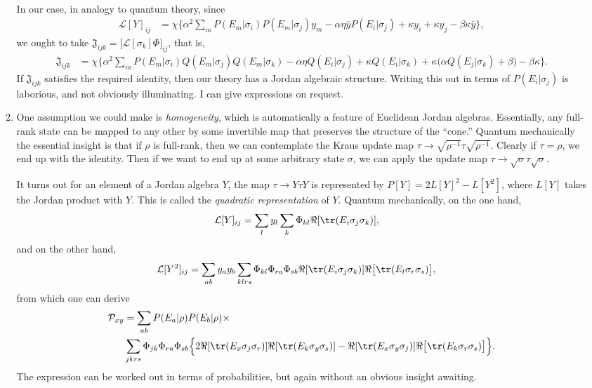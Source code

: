 \documentclass[11pt]{article}
\begin{document}
\begin{enumerate}
\begin{enumerate}
\begin{align}
\end{align}
In our case, in analogy to quantum theory, since
\begin{align*}
\mathcal{L}[Y]_{ij} &= 	\chi\Bigg\{\alpha^2 \sum_{m}P(E_m|\sigma_i) P(E_m|\sigma_j)y_m-\alpha \eta \bar{y} P(E_i|\sigma_j) +\kappa y_i+ \kappa  y_j -\beta \kappa \bar{y}\Bigg\},
\end{align*}
we ought to take  $\mathfrak{J}_{ijk}=\Big[\mathcal{L}[\sigma_k]\Phi\Big]_{ij}$, that is,
\begin{align*}
\mathfrak{J}_{ijk}&= 	\chi\Bigg\{\alpha^2 \sum_{m}P(E_m|\sigma_i) Q(E_m|\sigma_j)Q(E_m|\sigma_k)-\alpha \eta Q(E_i|\sigma_j) +\kappa Q(E_i|\sigma_k)+ \kappa  \big(\alpha Q(E_j|\sigma_k)+\beta\big) -\beta \kappa \Bigg\}.
\end{align*}
If $\mathfrak{J}_{ijk}$ satisfies the required identity, then our theory has a Jordan algebraic structure. Writing this out in terms of $P(E_i|\sigma_j)$ is laborious, and not obviously illuminating. I can give expressions on request.
\item One assumption we could make is \emph{homogeneity}, which is automatically a feature of Euclidean Jordan algebras. Essentially, any full-rank state can be mapped to any other by some invertible map that preserves the structure of the ``cone.'' Quantum mechanically the essential insight is that if $\rho$ is full-rank, then we can contemplate the Kraus update map $\tau \rightarrow \sqrt{\rho^{-1}}\tau \sqrt{\rho^{-1}}$. Clearly if $\tau=\rho$, we end up with the identity. Then if we want to end up at some arbitrary state $\sigma$, we can apply the update map $\tau \rightarrow \sqrt{\sigma} \tau \sqrt{\sigma}$. 

It turns out for an element of a Jordan algebra $Y$, the map $\tau \rightarrow Y\tau Y$  is represented by $P[Y]=2L[Y]^2-L[Y^2]$, where $L[Y]$ takes the Jordan product with $Y$. This is called the \emph{quadratic representation} of $Y$. Quantum mechanically, on the one hand,
\begin{align}
\mathcal{L}[Y]_{ij}&=\sum_{l} y_l \sum_k \Phi_{kl}\Re[\tr(E_i\sigma_j\sigma_k)],
\end{align}
and on the other hand,
\begin{align}
\mathcal{L}[Y^2]_{ij}&=\sum_{ab} y_a y_b\sum_{klrs}  \Phi_{kl}\Phi_{ra}\Phi_{sb}\Re[\tr(E_i\sigma_j\sigma_k)]\Re\big[\tr(E_l\sigma_r\sigma_s)\big],
\end{align}
from which one can derive
\begin{align}
\mathcal{P}_{xy} &=\sum_{ab} P(E_a|\rho)P(E_b|\rho)\times\\
&\sum_{jkrs}\Phi_{jk} \Phi_{ra}\Phi_{sb}\Big\{2\Re[\tr(E_x\sigma_j\sigma_r)] \Re[\tr(E_k\sigma_y\sigma_s)]-\Re[\tr(E_x\sigma_y\sigma_j)]\Re\big[\tr(E_k\sigma_r\sigma_s)\big]\Big\}.
\end{align}
The expression can be worked out in terms of probabilities, but again without an obvious insight awaiting.
\end{enumerate}


\end{enumerate}
\end{document}
